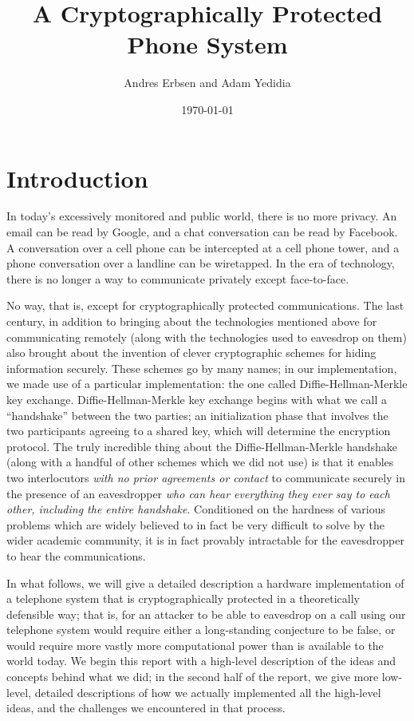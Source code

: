 \documentclass[a4paper]{report}
\title{A Cryptographically Protected Phone System}
\author{Andres Erbsen and Adam Yedidia}
\date{\today}
\begin{document}
\maketitle

\section{Introduction}

In today's excessively monitored and public world, there is no more privacy. An
email can be read by Google, and a chat conversation can be read by Facebook. A
conversation over a cell phone can be intercepted at a cell phone tower, and a
phone conversation over a landline can be wiretapped. In the era of technology,
there is no longer a way to communicate privately except face-to-face.

No way, that is, except for cryptographically protected communications. The last
century, in addition to bringing about the technologies mentioned above for
communicating remotely (along with the technologies used to eavesdrop on them)
also brought about the invention of clever cryptographic schemes for hiding
information securely. These schemes go by many names; in our implementation, we
made use of a particular implementation: the one called Diffie-Hellman-Merkle key
exchange. Diffie-Hellman-Merkle key exchange begins with what we call a ``handshake'' between the two parties; an initialization phase that involves the two participants agreeing to a shared key, which will %
determine the encryption protocol. The truly incredible thing about the Diffie-Hellman-Merkle handshake (along
with a handful of other schemes which we did not use) is that it enables two
interlocutors \emph{with no prior agreements or contact} to communicate securely
in the presence of an eavesdropper \emph{who can hear everything they ever say
to each other, including the entire handshake}. Conditioned on the hardness of various problems which are widely
believed to in fact be very difficult to solve by the wider academic community,
it is in fact provably intractable for the eavesdropper to hear the
communications.

In what follows, we will %
give a detailed description a hardware implementation of a telephone
system that is cryptographically protected in a theoretically defensible
way; that is, for an attacker to be able to eavesdrop on a call using our
telephone system would require either a long-standing conjecture to be false, or
would require more vastly more computational power than is available to the
world today. We begin this report with a high-level description of the ideas and concepts behind what we did; in the second half of the report, we give more low-level, detailed descriptions of how we actually implemented all the high-level ideas, and the challenges we encountered in that process.
\end{document}

